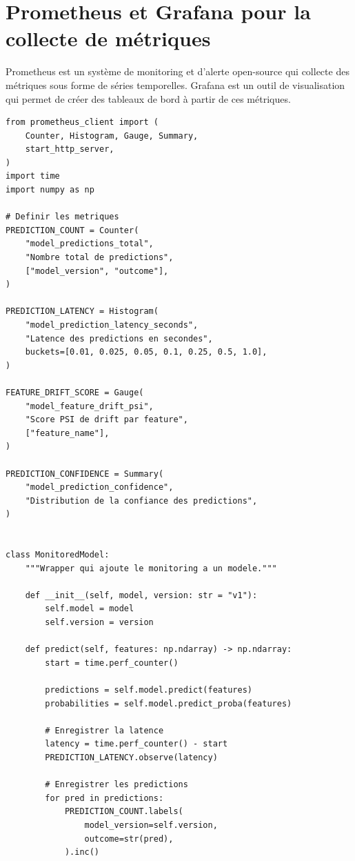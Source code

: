 \section{Prometheus et Grafana pour la collecte de m\'etriques}
\label{sec:prometheus-grafana}

Prometheus est un syst\`eme de monitoring et d'alerte open-source qui collecte des m\'etriques sous forme de s\'eries temporelles. Grafana est un outil de visualisation qui permet de cr\'eer des tableaux de bord \`a partir de ces m\'etriques.

\begin{codeblock}[title=\textbf{Exposer des m\'etriques ML avec Prometheus}]
\begin{verbatim}
from prometheus_client import (
    Counter, Histogram, Gauge, Summary,
    start_http_server,
)
import time
import numpy as np

# Definir les metriques
PREDICTION_COUNT = Counter(
    "model_predictions_total",
    "Nombre total de predictions",
    ["model_version", "outcome"],
)

PREDICTION_LATENCY = Histogram(
    "model_prediction_latency_seconds",
    "Latence des predictions en secondes",
    buckets=[0.01, 0.025, 0.05, 0.1, 0.25, 0.5, 1.0],
)

FEATURE_DRIFT_SCORE = Gauge(
    "model_feature_drift_psi",
    "Score PSI de drift par feature",
    ["feature_name"],
)

PREDICTION_CONFIDENCE = Summary(
    "model_prediction_confidence",
    "Distribution de la confiance des predictions",
)


class MonitoredModel:
    """Wrapper qui ajoute le monitoring a un modele."""

    def __init__(self, model, version: str = "v1"):
        self.model = model
        self.version = version

    def predict(self, features: np.ndarray) -> np.ndarray:
        start = time.perf_counter()

        predictions = self.model.predict(features)
        probabilities = self.model.predict_proba(features)

        # Enregistrer la latence
        latency = time.perf_counter() - start
        PREDICTION_LATENCY.observe(latency)

        # Enregistrer les predictions
        for pred in predictions:
            PREDICTION_COUNT.labels(
                model_version=self.version,
                outcome=str(pred),
            ).inc()


\end{verbatim}
\end{codeblock}
